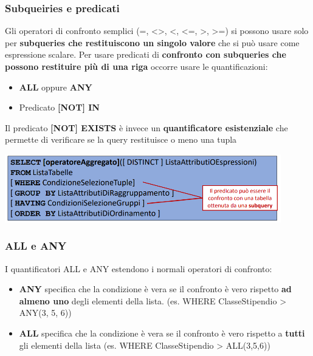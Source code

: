 \documentclass[12pt]{article}
\begin{document}
\subsubsection{Subqueiries e predicati}
Gli operatori di confronto semplici (=, <>, <, <=, >, >=) si possono usare solo per \textbf{subqueries che restituiscono un singolo valore} che si può usare come espressione scalare.
Per usare predicati di \textbf{confronto con subqueries che possono restituire più di una riga} occorre usare le quantificazioni:
\begin{itemize}
    \item \textbf{ALL} oppure \textbf{ANY}
    \item Predicato \textbf{[NOT] IN}
\end{itemize}
Il predicato \textbf{[NOT] EXISTS} è invece un \textbf{quantificatore esistenziale} che permette di verificare se la query restituisce o meno una tupla
\begin{center}
    \includegraphics[width = 0.90\textwidth]{Images/221.PNG}
\end{center}
\subsubsection{ALL e ANY}
I quantificatori ALL e ANY estendono i normali operatori di confronto:
\begin{itemize}
    \item \textbf{ANY} specifica che la condizione è vera se il confronto è vero rispetto \textbf{ad almeno uno} degli elementi della lista. (es. WHERE ClasseStipendio > ANY(3, 5, 6))
    \item \textbf{ALL} specifica che la condizione è vera se il confronto è vero rispetto a \textbf{tutti} gli elementi della lista (es. WHERE ClasseStipendio > ALL(3,5,6))
\end{itemize}
\end{document}
